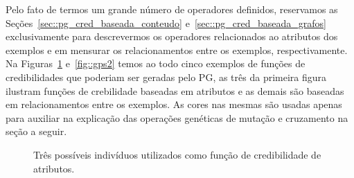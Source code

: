Pelo fato de termos um grande número de operadores definidos, reservamos as Seções~\ref{sec::pg_cred_baseada_conteudo} e~\ref{sec::pg_cred_baseada_grafos} exclusivamente para descrevermos os operadores relacionados ao atributos dos exemplos e em mensurar os relacionamentos entre os exemplos, respectivamente. Na Figuras~\ref{fig::gps1} e~\ref{fig::gps2} temos ao todo cinco exemplos de funções de credibilidades que poderiam ser geradas pelo \textsc{PG}, as três da primeira figura ilustram funções de crebilidade baseadas em atributos e as demais são baseadas em relacionamentos entre os exemplos. As cores nas mesmas são usadas apenas para auxiliar na explicação das operações genéticas de mutação e cruzamento na seção a seguir.

\begin{figure}[ht]
\centering
{}
\caption{Três possíveis indivíduos utilizados como função de credibilidade de atributos.}
\label{fig::gps1}
\end{figure}


